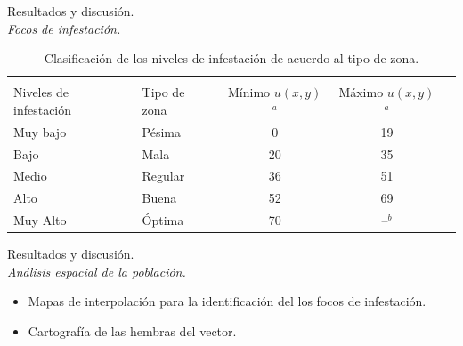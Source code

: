\begin{frame}[t]{Resultados y discusión.\\\textit{Focos de infestación.}}
\begin{center}
\begin{table}[!hptb]
    \begin{minipage}{\textwidth}
    \scriptsize
    \centering
    \caption{\label{tab:niveles-riesgo-zonas} Clasificación de los niveles de infestación de acuerdo al tipo de zona.}
    \begin{tabular}{l l c c c}
        \hline\\
         Niveles de infestación & Tipo de zona & Mínimo $u(x,y)$$^a$ & Máximo $u(x,y)$$^a$ \\
        \hline
        \hline
        Muy bajo & Pésima  & 0  & 19 \\
        Bajo     & Mala    & 20 & 35 \\
        Medio    & Regular & 36 & 51 \\
        Alto     & Buena   & 52 & 69 \\
        Muy Alto & Óptima  & 70 & --$^b$\\
    \end{tabular}
    \end{minipage}
\end{table}
\end{center}
\end{frame}

\begin{frame}[t]{Resultados y discusión.\\\textit{Análisis espacial de la población.}}
\begin{itemize}
	\item Mapas de interpolación para la identificación del los focos de infestación.
	\item Cartografía de las hembras del vector.
\end{itemize}
\end{frame}

